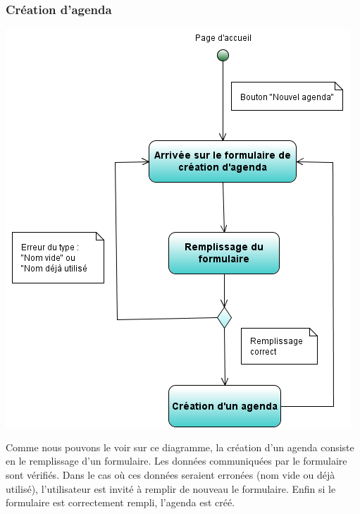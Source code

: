 \documentclass[12pt , a4paper]{article}
\begin{document}
\subsubsection{Création d'agenda}
\begin{center}
  \includegraphics[scale=0.6]{./images/diag_act_creation_agenda.png}
\end{center}
\noindent Comme nous pouvons le voir sur ce diagramme, la création d'un agenda consiste en  le remplissage d'un formulaire. Les données communiquées par le formulaire sont vérifiés. Dans le cas où ces
données seraient erronées (nom vide ou déjà utilisé), l'utilisateur est invité à remplir de nouveau le formulaire.
Enfin si le formulaire est correctement rempli, l'agenda est créé.
\end{document}
